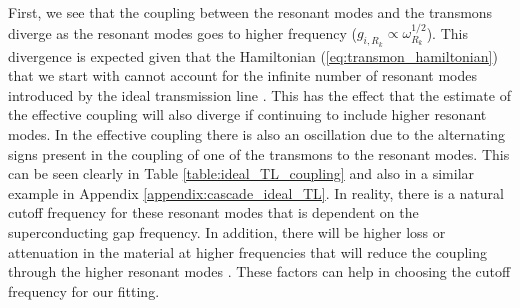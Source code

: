 First, we see that the coupling between the resonant modes and the transmons diverge as the resonant modes goes to higher frequency ($g_{i,R_k} \propto \omega_{R_k}^{1/2}$). This divergence is expected given that the Hamiltonian (\ref{eq:transmon_hamiltonian}) that we start with cannot account for the infinite number of resonant modes introduced by the ideal transmission line \cite{Parra-Rodriguez_2018}. This has the effect that the estimate of the effective coupling will also diverge if continuing to include higher resonant modes. In the effective coupling there is also an oscillation due to the alternating signs present in the coupling of one of the transmons to the resonant modes. This can be seen clearly in Table \ref{table:ideal_TL_coupling} and also in a similar example in Appendix \ref{appendix:cascade_ideal_TL}. In reality, there is a natural cutoff frequency for these resonant modes that is dependent on the superconducting gap frequency. In addition, there will be higher loss or attenuation in the material at higher frequencies that will reduce the coupling through the higher resonant modes \cite{picosecond_pulses,harmonic_superconducting}. These factors can help in choosing the cutoff frequency for our fitting.